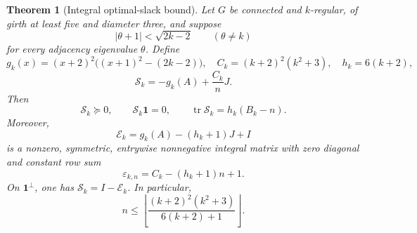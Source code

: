 \documentclass[a4paper,10pt,reqno]{amsart}
\theoremstyle{plain}
\newtheorem{theorem}{Theorem}[section]
\theoremstyle{definition}
\theoremstyle{remark}
\newcommand{\one}{\mathbf 1}
\newcommand{\tr}{\operatorname{tr}}
\newcommand{\resultbox}[1]{\boxed{#1}}
\begin{document}
\begin{theorem}[Integral optimal-slack bound]\label{thm:integral-slack}
Let \(G\) be connected and \(k\)-regular, of girth at least five and diameter
three, and suppose
\[
 \lvert\theta+1\rvert<\sqrt{2k-2}
 \qquad(\theta\ne k)
\]
for every adjacency eigenvalue \(\theta\).  Define
\[
 g_k(x)=(x+2)^2\bigl((x+1)^2-(2k-2)\bigr),\quad
 C_k=(k+2)^2(k^2+3),\quad h_k=6(k+2),
\]
\[
 \mathcal S_k=-g_k(A)+\frac{C_k}{n}J.
\]
Then
\[
 \mathcal S_k\succeq0,\qquad
 \mathcal S_k\one=0,\qquad
 \tr\mathcal S_k=h_k(B_k-n).
\]
Moreover,
\[
 \mathcal E_k=g_k(A)-(h_k+1)J+I
\]
is a nonzero, symmetric, entrywise nonnegative integral matrix with zero
diagonal and constant row sum
\[
 \varepsilon_{k,n}=C_k-(h_k+1)n+1.
\]
On \(\one^\perp\), one has \(\mathcal S_k=I-\mathcal E_k\).  In particular,
\[
 \resultbox{
 n\le
 \left\lfloor
 \frac{(k+2)^2(k^2+3)}{6(k+2)+1}
 \right\rfloor.
 }
\]
\end{theorem}
\end{document}
